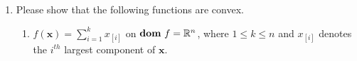 \documentclass[11pt,letter,notitlepage]{article}
\DeclareMathOperator*{\dom}{\bf dom\,}
\begin{document}
\begin{exercise}
    \begin{enumerate}
        \item
        Please show that the following functions are convex.
        \begin{enumerate}

            \item
            $f(\mathbf{x})=\sum_{i=1}^k x_{[i]}$ on $\dom f=\mathbb{R}^n$, where $1\le k\le n$ and $x_{[i]}$ denotes the $i^{th}$ largest component of $\mathbf{x}$.



\end{enumerate}
\end{enumerate}
\end{exercise}
\end{document}
